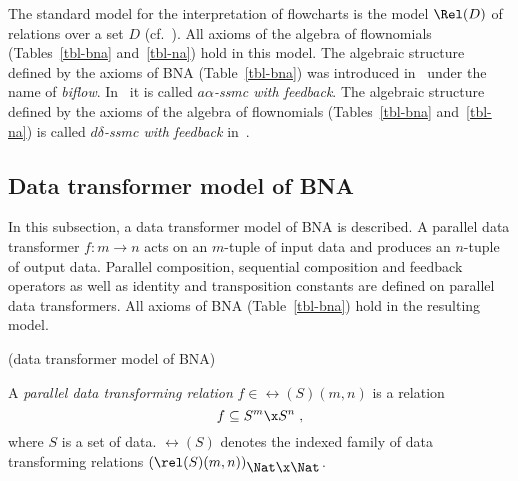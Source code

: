\documentclass[fleqn]{llncs}
\begin{document}
The standard model for the interpretation of flowcharts is the model
$\Rel(D)$ of relations over a set $D$ (cf.~\cite{CS90,Ste87b}).
All axioms of the algebra of flownomials (Tables~\ref{tbl-bna}
and~\ref{tbl-na}) hold in this model.
The algebraic structure defined by the axioms of BNA (Table~\ref{tbl-bna})
was introduced in~\cite{Ste86} under the name of {\em biflow}.
In~\cite{Ste94} it is called {\em $a\alpha$-ssmc with feedback}.
The algebraic structure defined by the axioms of the algebra of
flownomials (Tables~\ref{tbl-bna} and~\ref{tbl-na}) is called
{\em $d\delta$-ssmc with feedback\/} in~\cite{Ste94}.

\subsection{Data transformer model of BNA}
\label{bna-rel}
In this subsection, a data transformer model of BNA is described.
A parallel data transformer $f : m \to n$ acts on an $m$-tuple of input
data and produces an $n$-tuple of output data.
Parallel composition, sequential composition and feedback operators as
well as identity and transposition constants are defined on parallel
data transformers.
All axioms of BNA (Table~\ref{tbl-bna}) hold in the resulting model.

\bdfn (data transformer model of BNA)
\label{dfn-rel}

\noindent
A {\em parallel data transforming relation} $f \in \rel(S)(m,n)$
is a relation
$$
f \subseteq S^m \x  S^n\;,
$$
where $S$ is a set of data.
$\rel(S)$ denotes the indexed family of data transforming relations
$(\rel(S)(m,n))_{\textstyle \Nat \x \Nat}$.
\end{document}
